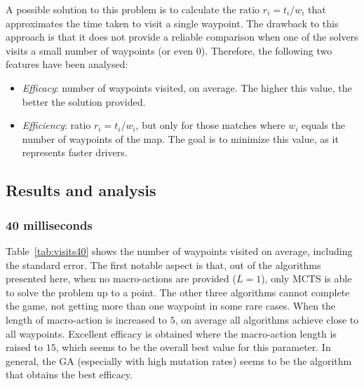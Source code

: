 \documentclass{sig-alternate}
\begin{document}
A possible solution to this problem is to calculate the ratio $r_i = t_i / w_i$ that approximates the time taken to visit a single waypoint. The drawback to this approach is that it does not provide a reliable comparison when one of the solvers visits a small number of waypoints (or even $0$). Therefore, the following two features have been analysed:
\begin{itemize}
\item \textit{Efficacy}: number of waypoints visited, on average. The higher this value, the better the solution provided.
\item \textit{Efficiency}: ratio $r_i = t_i / w_i$, but only for those matches where $w_i$ equals the number of waypoints of the map. The goal is to minimize this value, as it represents faster drivers.
\end{itemize}

\subsection{Results and analysis} \label{sec:wcci}

\subsubsection{40 milliseconds} 

Table~\ref{tab:visits40} shows the number of waypoints visited on average, including the standard error. The first notable aspect is that, out of the algorithms presented here, when no macro-actions are provided ($L=1$), only MCTS is able to solve the problem up to a point. The other three algorithms cannot complete the game, not getting more than one waypoint in some rare cases. When the length of macro-action is increased to $5$, on average all algorithms achieve close to all waypoints. Excellent efficacy is obtained where the macro-action length is raised to $15$, which seems to be the overall best value for this parameter. In general, the GA (especially with high mutation rates) seems to be the algorithm that obtains the best efficacy.
\end{document}
